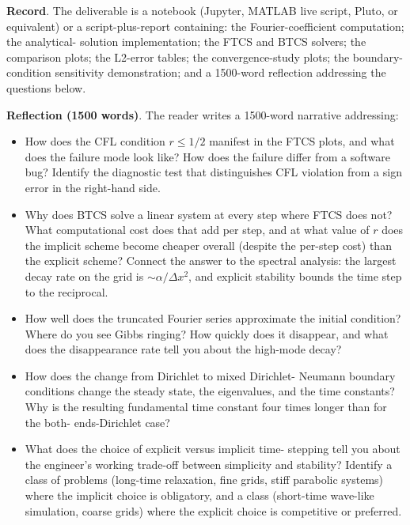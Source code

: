 \begin{project}
\textbf{Record}. The deliverable is a notebook (Jupyter, MATLAB
live script, Pluto, or equivalent) or a script-plus-report
containing: the Fourier-coefficient computation; the analytical-
solution implementation; the FTCS and BTCS solvers; the
comparison plots; the L2-error tables; the convergence-study
plots; the boundary-condition sensitivity demonstration; and a
1500-word reflection addressing the questions below.

\textbf{Reflection (1500 words)}. The reader writes a
1500-word narrative addressing:

\begin{itemize}[leftmargin=*]
  \item How does the CFL condition $r \leq 1/2$ manifest in the
    FTCS plots, and what does the failure mode look like? How
    does the failure differ from a software bug? Identify the
    diagnostic test that distinguishes CFL violation from a sign
    error in the right-hand side.
  \item Why does BTCS solve a linear system at every step where
    FTCS does not? What computational cost does that add per
    step, and at what value of $r$ does the implicit scheme become
    cheaper overall (despite the per-step cost) than the explicit
    scheme? Connect the answer to the spectral analysis: the
    largest decay rate on the grid is $\sim \alpha/\Delta x^{2}$,
    and explicit stability bounds the time step to the
    reciprocal.
  \item How well does the truncated Fourier series approximate
    the initial condition? Where do you see Gibbs ringing? How
    quickly does it disappear, and what does the disappearance
    rate tell you about the high-mode decay?
  \item How does the change from Dirichlet to mixed Dirichlet-
    Neumann boundary conditions change the steady state, the
    eigenvalues, and the time constants? Why is the resulting
    fundamental time constant four times longer than for the both-
    ends-Dirichlet case?
  \item What does the choice of explicit versus implicit time-
    stepping tell you about the engineer's working trade-off
    between simplicity and stability? Identify a class of
    problems (long-time relaxation, fine grids, stiff parabolic
    systems) where the implicit choice is obligatory, and a
    class (short-time wave-like simulation, coarse grids) where
    the explicit choice is competitive or preferred.
\end{itemize}


\end{project}
